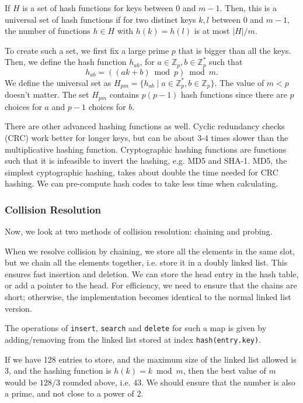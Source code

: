 \documentclass[a4paper, openany]{memoir}
\begin{document}
\noindent If $H$ is a set of hash functions for keys between 0 and $m-1$. Then, this is a universal set of hash functions if for two distinct keys $k, l$ between 0 and $m-1$, the number of functions $h \in H$ with $h(k) = h(l)$ is at most $|H|/m$. 

\noindent To create such a set, we first fix a large prime $p$ that is bigger than all the keys. Then, we define the hash function $h_{ab}$, for $a \in \mathbb{Z}_p, b \in \mathbb{Z}_p^*$ such that
\[h_{ab} = ((ak + b) \bmod{p}) \bmod{m}.\]
We define the universal set as $H_{pm} = \{h_{ab} \mid a \in \mathbb{Z}_p^*, b \in \mathbb{Z}_p\}$. The value of $m < p$ doesn't matter. The set $H_{pm}$ contains $p(p - 1)$ hash functions since there are $p$ choices for $a$ and $p-1$ choices for $b$.

\noindent There are other advanced hashing functions as well. Cyclic redundancy checks (CRC) work better for longer keys, but can be about 3-4 times slower than the multiplicative hashing function. Cryptographic hashing functions are functions such that it is infeasible to invert the hashing, e.g. MD5 and SHA-1. MD5, the simplest cyptographic hashing, takes about double the time needed for CRC hashing. We can pre-compute hash codes to take less time when calculating.

\subsubsection{Collision Resolution}
Now, we look at two methods of collision resolution: chaining and probing.

When we resolve collision by chaining, we store all the elements in the same slot, but we chain all the elements together, i.e. store it in a doubly linked list. This ensures fast insertion and deletion. We can store the head entry in the hash table, or add a pointer to the head. For efficiency, we need to ensure that the chains are short; otherwise, the implementation becomes identical to the normal linked list version.

\noindent The operations of \texttt{insert}, \texttt{search} and \texttt{delete} for such a map is given by adding/removing from the linked list stored at index \texttt{hash(entry.key)}.

\noindent If we have 128 entries to store, and the maximum size of the linked list allowed is 3, and the hashing function is $h(k) = k \bmod{m}$, then the best value of $m$ would be $128/3$ rounded above, i.e. 43. We should ensure that the number is also a prime, and not close to a power of 2. 
\end{document}
